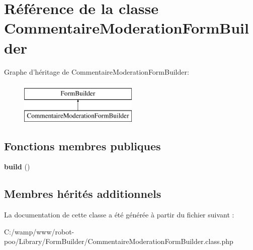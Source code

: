 \hypertarget{class_library_1_1_form_builder_1_1_commentaire_moderation_form_builder}{\section{Référence de la classe Commentaire\+Moderation\+Form\+Builder}
\label{class_library_1_1_form_builder_1_1_commentaire_moderation_form_builder}
}
Graphe d'héritage de Commentaire\+Moderation\+Form\+Builder\+:\begin{figure}[H]
\begin{center}
\leavevmode
\includegraphics[height=2.000000cm]{class_library_1_1_form_builder_1_1_commentaire_moderation_form_builder}
\end{center}
\end{figure}
\subsection*{Fonctions membres publiques}
\begin{DoxyCompactItemize}
\item 
\hypertarget{class_library_1_1_form_builder_1_1_commentaire_moderation_form_builder_a3928875ef0ceb18a51c1061be3eb3a00}{{\bfseries build} ()}\label{class_library_1_1_form_builder_1_1_commentaire_moderation_form_builder_a3928875ef0ceb18a51c1061be3eb3a00}

\end{DoxyCompactItemize}
\subsection*{Membres hérités additionnels}


La documentation de cette classe a été générée à partir du fichier suivant \+:\begin{DoxyCompactItemize}
\item 
C\+:/wamp/www/robot-\/poo/\+Library/\+Form\+Builder/Commentaire\+Moderation\+Form\+Builder.\+class.\+php\end{DoxyCompactItemize}
